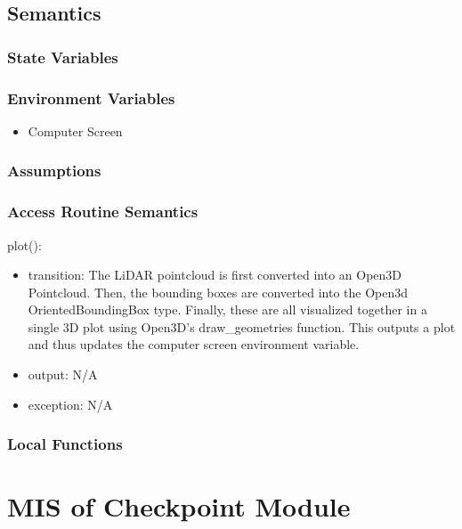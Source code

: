 \documentclass[12pt, titlepage]{article}
\begin{document}
\subsection{Semantics}

\subsubsection{State Variables}

\subsubsection{Environment Variables}

\begin{itemize}
  \item Computer Screen
\end{itemize}

\subsubsection{Assumptions}



\subsubsection{Access Routine Semantics}
\noindent plot():
\begin{itemize}
\item transition: The LiDAR pointcloud is first converted into an Open3D Pointcloud. Then, the bounding boxes are converted into the Open3d OrientedBoundingBox type. Finally, these are all visualized together in a single 3D plot using Open3D's draw\_geometries function. This outputs a plot and thus updates the computer screen environment variable.
\item output: N/A
\item exception: N/A
\end{itemize}

\subsubsection{Local Functions}

\newpage

\section{MIS of Checkpoint Module} \label{ModuleCkpt} 
\end{document}
